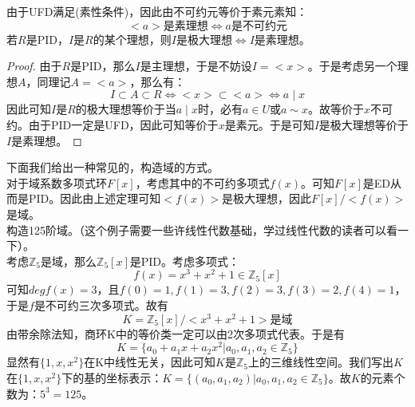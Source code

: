 由于UFD满足(素性条件)，因此由不可约元等价于素元素知：
\[
<a>\text{是素理想}\iff a\text{是不可约元}
\]
若$R$是PID，$I$是$R$的某个理想，则$I$是极大理想$\iff I$是素理想。
\begin{proof}
由于$R$是PID，那么$I$是主理想，于是不妨设$I=<x>$。于是考虑另一个理想$A$，同理记$A=<a>$，那么有：\[
I\subset A\subset R\iff<x>\subset <a>\iff a\mid x
\]
因此可知$I$是$R$的极大理想等价于当$a\mid x$时，必有$a\in U$或$a\sim x$。故等价于$x$不可约。由于PID一定是UFD，因此可知等价于$x$是素元。于是可知$I$是极大理想等价于$I$是素理想。
\end{proof}
下面我们给出一种常见的，构造域的方式。\\
对于域系数多项式环$F[x]$，考虑其中的不可约多项式$f(x)$。可知$F[x]$是ED从而是PID。因此由上述定理可知$<f(x)>$是极大理想，因此$F[x]/<f(x)>$是域。\\
构造125阶域。（这个例子需要一些许线性代数基础，学过线性代数的读者可以看一下）。\\
\indent 考虑$\mathbb{Z}_5$是域，那么$\mathbb{Z}_5[x]$是PID。考虑多项式：
\[
f(x)=x^3+x^2+1\in \mathbb{Z}_5[x]
\]
可知$degf(x)=3$，且$f(0)=1,f(1)=3,f(2)=3,f(3)=2,f(4)=1$，于是$f$是不可约三次多项式。故有
\[
K=\mathbb{Z}_5[x]/<x^3+x^2+1>\text{是域}
\]
由带余除法知，商环K中的等价类一定可以由2次多项式代表。于是有
\[
K=\{a_0+a_1x+a_2x^2|a_0,a_1,a_2\in \mathbb{Z}_5\}
\]
\indent 显然有$\{1,x,x^2\}$在K中线性无关，因此可知$K$是$\mathbb{Z}_5$上的三维线性空间。我们写出$K$在$\{1,x,x^2\}$下的基的坐标表示：$K=\{(a_0,a_1,a_2)|a_0,a_1,a_2\in \mathbb{Z}_5\}$。故$K$的元素个数为：$5^3=125$。